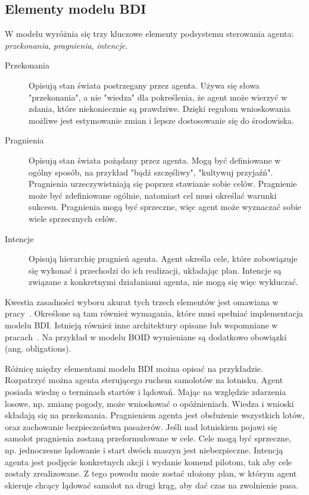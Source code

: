 \subsection{Elementy modelu BDI}
W modelu wyróżnia się trzy kluczowe elementy podsystemu sterowania agenta: \textit{przekonania}, \textit{pragnienia}, \textit{intencje}.

\begin{description}
\item[Przekonania] {
Opisują stan świata postrzegany przez agenta. Używa się słowa "przekonania", a nie "wiedza" dla pokreślenia, że agent może wierzyć w zdania, które niekoniecznie są prawdziwe. Dzięki regułom wnioskowania możliwe jest estymowanie zmian i lepsze dostosowanie się do środowiska. }
\item[Pragnienia]{
Opisują stan świata pożądany przez agenta. Mogą być definiowane w ogólny sposób, na przykład "bądź szczęśliwy", "kultywuj przyjaźń".
Pragnienia urzeczywistniają się poprzez stawianie sobie celów. Pragnienie może być zdefiniowane ogólnie, natomiast cel musi określać warunki sukcesu. Pragnienia mogą być sprzeczne, więc agent może wyznaczać sobie wiele sprzecznych celów. }
\item[Intencje]{
Opisują hierarchię pragnień agenta. Agent określa cele, które zobowiązuje się wykonać i przechodzi do ich realizacji, układając plan. Intencje są związane z konkretnymi działaniami agenta, nie mogą się więc wykluczać. }
\end{description}

Kwestia zasadności wyboru akurat tych trzech elementów jest omawiana w pracy~\cite{RAO}. Określone są tam również wymagania, które musi spełniać implementacja modelu BDI. Istnieją również inne architektury opisane lub wspomniane w pracach~\cite{NORL, DIGN}. Na przykład w modelu BOID wymieniane są dodatkowo obowiązki (ang. obligations).~\cite{BROE}

Różnicę między elementami modelu BDI można opisać na przykładzie. Rozpatrzyć można agenta sterującego ruchem samolotów na lotnisku. Agent posiada wiedzę o terminach startów i lądowań. Mając na względzie zdarzenia losowe, np. zmianę pogody, może wnioskować o opóźnieniach. Wiedza i wnioski składają się na przekonania. Pragnieniem agenta jest obsłużenie wszystkich lotów, oraz zachowanie bezpieczeństwa pasażerów. Jeśli nad lotniskiem pojawi się samolot pragnienia zostaną przeformułowane w cele. Cele mogą być sprzeczne, np. jednoczesne lądowanie i start dwóch maszyn jest niebezpieczne. Intencją agenta jest podjęcie konkretnych akcji i wydanie komend pilotom, tak aby cele zostały zrealizowane. Z tego powodu może zostać ułożony plan, w którym agent skieruje chcący lądować samolot na drugi krąg, aby dać czas na zwolnienie pasa.

